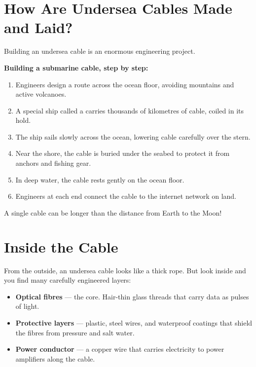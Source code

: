 \sectionrule

\section*{How Are Undersea Cables Made and Laid?}

Building an undersea cable is an enormous engineering project.

\begin{quickmap}
  \textbf{Building a submarine cable, step by step:}
  \begin{enumerate}[label=\textbf{\arabic*.}]
    \item Engineers design a route across the ocean floor, avoiding mountains and active volcanoes.
    \item A special ship called a  carries thousands of kilometres of cable, coiled in its hold.
    \item The ship sails slowly across the ocean, lowering cable carefully over the stern.
    \item Near the shore, the cable is buried under the seabed to protect it from anchors and fishing gear.
    \item In deep water, the cable rests gently on the ocean floor.
    \item Engineers at each end connect the cable to the internet network on land.
  \end{enumerate}
\end{quickmap}

A single cable can be longer than the distance from Earth to the Moon!

\sectionrule

\section*{Inside the Cable}

From the outside, an undersea cable looks like a thick rope.
But look inside and you find many carefully engineered layers:

\begin{itemize}
  \item \textbf{Optical fibres} — the core. Hair-thin glass threads that carry data as pulses of light.
  \item \textbf{Protective layers} — plastic, steel wires, and waterproof coatings that shield the fibres from pressure and salt water.
  \item \textbf{Power conductor} — a copper wire that carries electricity to power amplifiers along the cable.
\end{itemize}

